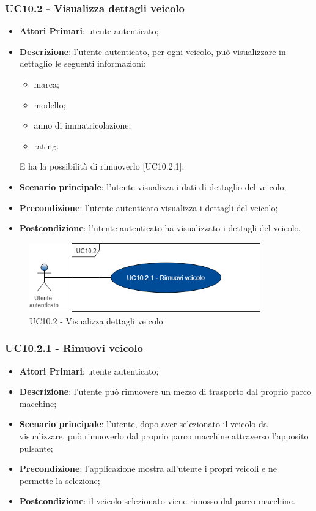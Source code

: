\subsubsection{UC10.2 - Visualizza dettagli veicolo}
\begin{itemize}
	\item \textbf{Attori Primari}: utente autenticato;
	\item \textbf{Descrizione}: l'utente autenticato, per ogni veicolo, può visualizzare in dettaglio le seguenti informazioni:
	\begin{itemize}
		\item marca;
		\item modello;
		\item anno di immatricolazione;
		\item rating.
	\end{itemize}
	E ha la possibilità di rimuoverlo [UC10.2.1];
	\item \textbf{Scenario principale}: l'utente visualizza i dati di dettaglio del veicolo;
	\item \textbf{Precondizione}: l'utente autenticato visualizza i dettagli del veicolo;
	\item \textbf{Postcondizione}: l'utente autenticato ha visualizzato i dettagli del veicolo.
\end{itemize}
\begin{figure}[H]
	\includegraphics[width=10cm]{res/images/UC10-2Dettagliveicolo.png}
	\centering
	\caption{UC10.2 - Visualizza dettagli veicolo}
\end{figure}
\subsubsection{UC10.2.1 - Rimuovi veicolo}
\begin{itemize}
	\item \textbf{Attori Primari}: utente autenticato;
	\item \textbf{Descrizione}: l'utente può rimuovere un mezzo di trasporto dal proprio parco macchine;
	\item \textbf{Scenario principale}: l'utente, dopo aver selezionato il veicolo da visualizzare, può rimuoverlo dal proprio parco macchine attraverso l'apposito pulsante;
	\item \textbf{Precondizione}: l'applicazione mostra all'utente i propri veicoli e ne permette la selezione;
	\item \textbf{Postcondizione}: il veicolo selezionato viene rimosso dal parco macchine.
\end{itemize}